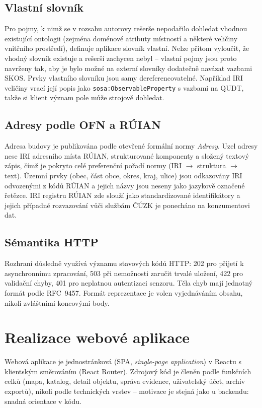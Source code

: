 \subsection{Vlastní slovník}

Pro pojmy, k nimž se v rozsahu autorovy rešerše nepodařilo dohledat vhodnou existující ontologii (zejména doménové atributy místností a některé veličiny vnitřního prostředí), definuje aplikace slovník vlastní. Nelze přitom vyloučit, že vhodný slovník existuje a rešerší zachycen nebyl -- vlastní pojmy jsou proto navrženy tak, aby je bylo možné na externí slovníky dodatečně navázat vazbami SKOS. Prvky vlastního slovníku jsou samy dereferencovatelné. Například IRI veličiny vrací její popis jako \texttt{sosa:ObservableProperty} s vazbami na QUDT, takže si klient význam pole může strojově dohledat.

\subsection{Adresy podle OFN a RÚIAN}

Adresa budovy je publikována podle otevřené formální normy \emph{Adresy}. Uzel adresy nese IRI adresního místa RÚIAN, strukturované komponenty a složený textový zápis, čímž je pokryto celé preferenční pořadí normy (IRI $\rightarrow$ struktura $\rightarrow$ text). Územní prvky (obec, část obce, okres, kraj, ulice) jsou odkazovány IRI odvozenými z kódů RÚIAN a jejich názvy jsou neseny jako jazykově označené řetězce. IRI registru RÚIAN zde slouží jako standardizované identifikátory a jejich případné rozvazování vůči službám ČÚZK je ponecháno na konzumentovi dat.

\subsection{Sémantika HTTP}

Rozhraní důsledně využívá významu stavových kódů HTTP: 202 pro přijetí k asynchronnímu zpracování, 503 při nemožnosti zaručit trvalé uložení, 422 pro validační chyby, 401 pro neplatnou autentizaci senzoru. Těla chyb mají jednotný formát podle RFC~9457. Formát reprezentace je volen vyjednáváním obsahu, nikoli zvláštními koncovými body.

\section{Realizace webové aplikace}
\label{sec:frontend}

Webová aplikace je jednostránková (SPA, \emph{single-page application}) v Reactu s klientským směrováním (React Router). Zdrojový kód je členěn podle funkčních celků (mapa, katalog, detail objektu, správa evidence, uživatelský účet, archiv exportů), nikoli podle technických vrstev -- motivace je stejná jako u backendu: snadná orientace v kódu.

